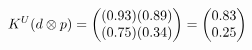 \documentclass[preview]{standalone}
\begin{document}
\begin{align*}
\special{dvisvgm:raw <g id='unique000'>}K^U(d \otimes p) = \begin{pmatrix} (0.93)(0.89) \\ (0.75)(0.34) \end{pmatrix} = \begin{pmatrix} 0.83 \\ 0.25 \end{pmatrix}\special{dvisvgm:raw </g>}
\end{align*}
\end{document}
